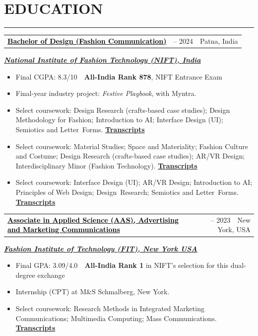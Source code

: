 \documentclass[10pt,letterpaper]{article}
\makeatletter
\newcommand{\weblink}[2]{\href{#1}{\textbf{#2}}}
\newcommand{\blacklink}[2]{\href{#1}{\textcolor{black}{#2}}}
\newcommand{\sectionrule}{\par\vspace{-2pt}\noindent\rule{\linewidth}{0.4pt}\par\vspace{2pt}}
\newenvironment{spread}[2][\normalsize]{\par\begingroup\linespread{#2}#1\selectfont}{\par\endgroup}
\newcommand{\entry}[2]{%
  \par\noindent
  \begin{tabularx}{\linewidth}{@{}X r@{}}
    \textbf{#1} & \normalfont #2
  \end{tabularx}\par
}
\newcommand{\entrygap}{\vspace{5pt}}
\newcommand{\subline}[1]{{\setlength{\rightskip}{2.7em}\itshape\small #1\par}\vspace{1pt}}
\makeatother
\begin{document}
\begin{spread}{1.07}
\section{\MakeUppercase{Education}}
\sectionrule

\entry{\blacklink{https://drive.google.com/file/d/15ZjRr5q6_3QodrlmPGc5MxLBXLteZns3/view?usp=sharing}{Bachelor of Design (Fashion Communication)}}{2020 -- 2024~\textbar\ Patna, India}
\subline{\weblink{https://nift.ac.in/}{National Institute of Fashion Technology (NIFT), India}}
\begin{itemize}
  \item Final CGPA: 8.3/10~\textbar\ \textbf{All-India Rank 878}, NIFT Entrance Exam
  \item Final-year industry project: \textit{Festive Playbook}, with Myntra.
\ifdefined\EDRES
  \item Select coursework: Design Research (crafts-based case studies); Design Methodology for Fashion; Introduction to AI; Interface Design (UI); Semiotics and Letter~Forms. \weblink{https://drive.google.com/file/d/1mAdvgwz9V8V-WBmV5T0NfUh7NFnwv4RZ/view?usp=sharing}{Transcripts}
\else\ifdefined\TEXTILE
  \item Select coursework: Material Studies; Space and Materiality; Fashion Culture and Costume; Design Research (crafts-based case studies); AR/VR Design; Interdisciplinary Minor (Fashion Technology). \weblink{https://drive.google.com/file/d/1mAdvgwz9V8V-WBmV5T0NfUh7NFnwv4RZ/view?usp=sharing}{Transcripts}
\else
  \item Select coursework: Interface Design (UI); AR/VR Design; Introduction to AI; Principles of Web Design; Design~Research; Semiotics and Letter~Forms. \weblink{https://drive.google.com/file/d/1mAdvgwz9V8V-WBmV5T0NfUh7NFnwv4RZ/view?usp=sharing}{Transcripts}
\fi\fi
\end{itemize}

\entrygap
{}
\entry{\blacklink{https://drive.google.com/file/d/17dy8an7OjKxL5iDDffVQ3rNIcmwwwc8o/view?usp=sharing}{Associate in Applied Science (AAS), Advertising and Marketing Communications}}{2022 -- 2023~\textbar\ New York, USA}
\subline{\weblink{https://www.fitnyc.edu/}{Fashion Institute of Technology (FIT), New York USA}}
\begin{itemize}
  \item Final GPA: 3.09/4.0~\textbar\ \textbf{All-India Rank 1} in NIFT's selection for this dual-degree exchange
  \item Internship (CPT) at M\&S Schmalberg, New York.
  \item Select coursework: Research Methods in Integrated Marketing Communications; Multimedia Computing; Mass Communications. \weblink{https://drive.google.com/file/d/1Jwpo17iYTP66lsSBYnFyPfe6mJzgGSVW/view?usp=sharing}{Transcripts}
\end{itemize}


\end{spread}
\end{document}
